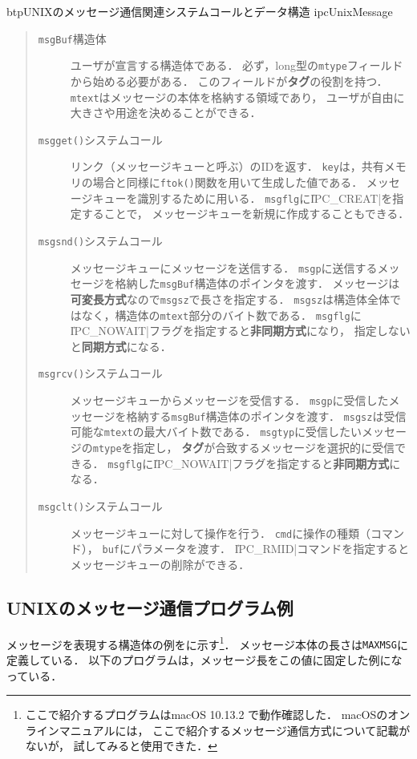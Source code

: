 \begin{myfig}{btp}{UNIXのメッセージ通信関連システムコールとデータ構造}
{ipcUnixMessage}

\end{myfig}

\begin{quote}
\begin{description}
\item [{\tt msgBuf}構造体]
ユーザが宣言する構造体である．
必ず，long型の{\tt mtype}フィールドから始める必要がある．
このフィールドが{\bf タグ}の役割を持つ．
{\tt mtext}はメッセージの本体を格納する領域であり，
ユーザが自由に大きさや用途を決めることができる．

\item [{\tt msgget()}システムコール]
リンク（メッセージキューと呼ぶ）のIDを返す．
{\tt key}は，共有メモリの場合と同様に{\tt ftok()}関数を用いて生成した値である．
メッセージキューを識別するために用いる．
{\tt msgflg}に\|IPC_CREAT|を指定することで，
メッセージキューを新規に作成することもできる．

\item [{\tt msgsnd()}システムコール]
メッセージキューにメッセージを送信する．
{\tt msgp}に送信するメッセージを格納した{\tt msgBuf}構造体のポインタを渡す．
メッセージは{\bf 可変長方式}なので{\tt msgsz}で長さを指定する．
{\tt msgsz}は構造体全体ではなく，構造体の{\tt mtext}部分のバイト数である．
{\tt msgflg}に\|IPC_NOWAIT|フラグを指定すると{\bf 非同期方式}になり，
指定しないと{\bf 同期方式}になる．

\item [{\tt msgrcv()}システムコール]
メッセージキューからメッセージを受信する．
{\tt msgp}に受信したメッセージを格納する{\tt msgBuf}構造体のポインタを渡す．
{\tt msgsz}は受信可能な{\tt mtext}の最大バイト数である．
{\tt msgtyp}に受信したいメッセージの{\tt mtype}を指定し，
{\bf タグ}が合致するメッセージを選択的に受信できる．
{\tt msgflg}に\|IPC_NOWAIT|フラグを指定すると{\bf 非同期方式}になる．

\item [{\tt msgclt()}システムコール]
メッセージキューに対して操作を行う．
{\tt cmd}に操作の種類（コマンド），
{\tt buf}にパラメータを渡す．
\|IPC_RMID|コマンドを指定するとメッセージキューの削除ができる．
\end{description}
\end{quote}

\subsection{UNIXのメッセージ通信プログラム例}
メッセージを表現する構造体の例をに示す\footnote{
ここで紹介するプログラムはmacOS 10.13.2 で動作確認した．
macOSのオンラインマニュアルには，
ここで紹介するメッセージ通信方式について記載がないが，
試してみると使用できた．}．
メッセージ本体の長さは{\tt MAXMSG}に定義している．
以下のプログラムは，メッセージ長をこの値に固定した例になっている．

